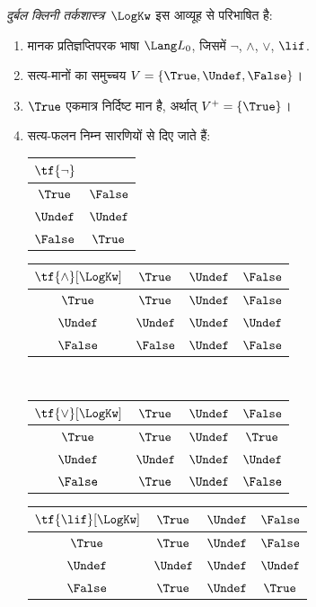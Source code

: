 \documentclass[../../../include/open-logic-section]{subfiles}
\begin{document}
\begin{defn}
\emph{दुर्बल क्लिनी तर्कशास्त्र}~$\LogKw$ इस आव्यूह से परिभाषित है:
\begin{enumerate}
  \item मानक प्रतिज्ञप्तिपरक भाषा $\Lang L_0$, जिसमें
  $\lnot$, $\land$, $\lor$, $\lif$.
  \item सत्य-मानों का समुच्चय $V = \{\True, \Undef, \False\}$।
  \item $\True$ एकमात्र निर्दिष्ट मान है, अर्थात् $V^+ = \{\True\}$।
  \item सत्य-फलन निम्न सारणियों से दिए जाते हैं:
  \begin{center}
    \begin{tabular}{c|c} 
      $\tf{\lnot}$ & \\ 
      \hline  
      $\True$ & $\False$ \\ 
      $\Undef$ & $\Undef$ \\
      $\False$ & $\True$ 
    \end{tabular}
    \quad
    \begin{tabular}{c|ccc} 
      $\tf{\land}[\LogKw]$ & $\True$ & $\Undef$ & $\False$ \\ 
      \hline 
      $\True$ & $\True$ & $\Undef$ & $\False$ \\ 
      $\Undef$ & $\Undef$ & $\Undef$ & $\Undef$\\ 
      $\False$ & $\False$ & $\Undef$ & $\False$ 
    \end{tabular}
    \\[2ex]
    \begin{tabular}{c|ccc} 
      $\tf{\lor}[\LogKw]$ & $\True$ & $\Undef$ & $\False$ \\ 
      \hline 
      $\True$ & $\True$ & $\Undef$ & $\True$ \\ 
      $\Undef$ & $\Undef$ & $\Undef$ & $\Undef$ \\
      $\False$ & $\True$ & $\Undef$ & $\False$ 
    \end{tabular}
    \quad
    \begin{tabular}{c|ccc} 
      $\tf{\lif}[\LogKw]$ & $\True$ & $\Undef$ & $\False$ \\ 
      \hline 
      $\True$ & $\True$ & $\Undef$ & $\False$ \\ 
      $\Undef$ & $\Undef$ & $\Undef$ & $\Undef$  \\ 
      $\False$ & $\True$ & $\Undef$ & $\True$ 
    \end{tabular}
  \end{center} 
\end{enumerate}
\end{defn}
\end{document}
